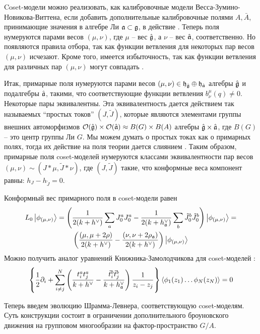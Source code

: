 Coset-модели можно реализовать, как калибровочные модели Весса-Зумино-Новикова-Виттена, если добавить дополнительные калибровочные полями  $A, \bar{A}$, принимающие значения в алгебре Ли $\mathfrak{a}\subset \mathfrak{g}$, в действие \cite{gawdzki1988g}. Теперь поля нумеруются парами весов  $(\mu,\nu)$, где $\mu$ -- вес  $\hat{\mathfrak{g}}$, а $\nu$ -- вес $\hat{\mathfrak{a}}$, соответственно. Но появляются правила отбора, так как функции ветвления для некоторых пар весов  $(\mu,\nu)$ исчезают. Кроме того, имеется избыточность, так как функции ветвления для различных пар $(\mu,\nu)$ могут совпадать \cite{fuchs1996resolution,schellekens1990field}.

Итак, примарные поля нумеруются парами весов  $(\mu,\nu)\in \mathfrak{h}_{\hat{\mathfrak{g}}}\oplus \mathfrak{h}_{\hat{\mathfrak{a}}}$ алгебры $\hat{\mathfrak{g}}$ и подалгебры $\hat{\mathfrak{a}}$, такими, что соответствующие функции ветвления $b^{\mu}_{\nu}(q)\neq 0$. Некоторые пары эквивалентны. Эта эквивалентность дается действием так называемых ``простых токов'' $(J,\tilde{J})$, которые являются элементами группы внешних автоморфизмов  $\mathcal{O}(\hat{\mathfrak{g}})\times \mathcal{O}(\hat{\mathfrak{a}})\approx B(G)\times B(A)$ алгебры $\hat{\mathfrak{g}}\times\hat{\mathfrak{a}}$, где $B(G)$ -- это центр группы Ли $G$. Мы можем думать о простых токах как о примарных полях, тогда их действие на поля теории дается слиянием \cite{difrancesco1997cft}. Таким образом, примарные поля coset-моделей нумеруются классами эквивалентности пар весов  $(\mu,\nu)\sim (J*\mu,\tilde{J}*\nu)$, где $(J,\tilde J)$ такие, что  конформные веса компонент равны:  $h_{J}-h_{\tilde{J}}=0$. 

Конформный вес примарного поля в coset-модели равен
\begin{multline}
  L_0\left|\phi_{(\mu,\nu)}\right>=\left(\frac{1}{2(k+h^{\vee})}\sum_aJ^a_0J^a_0-\frac{1}{2(k+h_{\mathfrak{a}}^{\vee})}\sum_b \tilde{J}^b_0 \tilde{J}^b_0 \right)
  \left|\phi_{(\mu,\nu)}\right>=\\
  \left(\frac{(\mu,\mu+2\rho)}{2(k+h^{\vee})}-\frac{(\nu,\nu+2\rho_{\mathfrak{a}})}{2(k+h^{\vee})}\right)\left|\phi_{(\mu,\nu)}\right>
\end{multline}
Можно получить аналог уравнений Книжника-Замолодчикова для coset-моделей \cite{kogan1997knizhnik}:
\begin{equation}
  \left\{\frac{1}{2}\partial_{i} + \sum_{i\neq j}^{N}\left(\frac{t^{a}_{i}t^{a}_{j}}{k+h^{\vee}}-\frac{\tilde t^{b}_{i}\tilde t^{b}_{j}}{k+h^{\vee}_{\mathfrak{a}}}\right)\frac{1}{z_{i}-z_{j}}\right\} \left<\phi_{1}(z_{1})\dots \phi_{N}(z_{N})\right>=0
  \label{eq:6}
\end{equation}

Теперь введем эволюцию Шрамма-Левнера, соответствующую coset-моделям. Суть конструкции состоит в ограничении дополнительного броуновского движения на групповом многообразии на фактор-пространство  $G/A$. 


